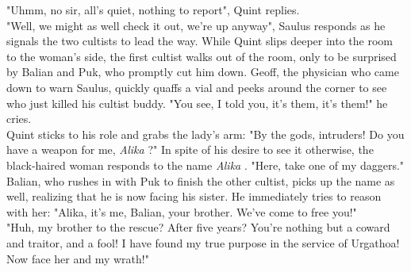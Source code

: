 "Uhmm, no sir, all's quiet, nothing to report", Quint replies.\\

"Well, we might as well check it out, we're up anyway", Saulus responds as he signals the two cultists to lead the way. While Quint slips deeper into the room to the woman's side, the first cultist walks out of the room, only to be surprised by Balian and Puk, who promptly cut him down. Geoff, the physician who came down to warn Saulus, quickly quaffs a vial and peeks around the corner to see who just killed his cultist buddy. "You see, I told you, it's them, it's them!" he cries.\\

Quint sticks to his role and grabs the lady's arm: "By the gods, intruders! Do you have a weapon for me, {\itshape Alika} ?" In spite of his desire to see it otherwise, the black-haired woman responds to the name  {\itshape Alika} . "Here, take one of my daggers." Balian, who rushes in with Puk to finish the other cultist, picks up the name as well, realizing that he is now facing his sister. He immediately tries to reason with her: "Alika, it's me, Balian, your brother. We've come to free you!"\\

"Huh, my brother to the rescue? After five years? You're nothing but a coward and traitor, and a fool! I have found my true purpose in the service of Urgathoa! Now face her and my wrath!"\\

